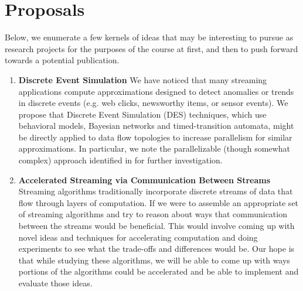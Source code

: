 \documentclass[11pt,letterpaper]{article}
\begin{document}
\section*{Proposals}

Below, we enumerate a few kernels of ideas that may be interesting to pursue as research projects for the purposes of the course at first, and then to push forward towards a potential publication.

\begin{enumerate}

    \item \textbf{Discrete Event Simulation} We have noticed that many streaming applications compute approximations designed to detect anomalies or trends in discrete events (e.g. web clicks, newsworthy items, or sensor events). We propose that Discrete Event Simulation (DES) techniques, which use behavioral models, Bayesian networks and timed-transition automata, might be directly applied to data flow topologies to increase parallelism for similar approximations. In particular, we note the parallelizable (though somewhat complex) approach identified in \cite{klerx2014model} for further investigation.

    \item \textbf{Accelerated Streaming via Communication Between Streams}
    Streaming algorithms traditionally incorporate discrete streams of data that flow through layers of computation. If we were to assemble an appropriate set of streaming algorithms and try to reason about ways that communication between the streams would be beneficial. This would involve coming up with novel ideas and techniques for accelerating computation and doing experiments to see what the trade-offs and differences would be. Our hope is that while studying these algorithms, we will be able to come up with ways portions of the algorithms could be accelerated and be able to implement and evaluate those ideas.

\end{enumerate}



\end{document}
